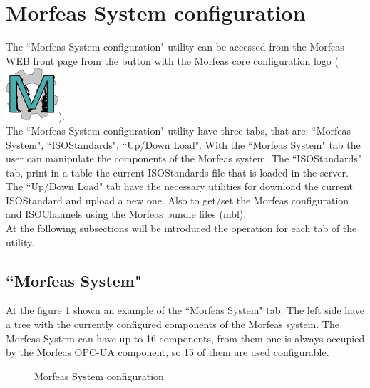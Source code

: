 \newpage
\section{Morfeas System configuration} \label{sys_conf}
The ``Morfeas System configuration" utility can be accessed from the Morfeas WEB front page from the button with the Morfeas core configuration logo
(\includegraphics[height=.150in]{../art/morfeas_gear.png}).\\

The ``Morfeas System configuration" utility have three tabs, that are: ``Morfeas System", ``ISOStandards", ``Up/Down Load".
With the ``Morfeas System" tab the user can manipulate the components of the Morfeas system.
The ``ISOStandards" tab, print in a table the current ISOStandards file that is loaded in the server.
The ``Up/Down Load" tab have the necessary utilities for download the current ISOStandard and upload a new one.
Also to get/set the Morfeas configuration and ISOChannels using the Morfeas bundle files (mbl).\\

\noindent At the following subsections will be introduced the operation for each tab of the utility.

\subsection{``Morfeas System"}
At the figure \ref{fig:Morfeas_sys_conf} shown an example of the ``Morfeas System" tab.
The left side have a tree with the currently configured components of the Morfeas system.
The Morfeas System can have up to 16 components, from them one is always occupied by the Morfeas OPC-UA component,
so 15 of them are used configurable.

\begin{figure}[h]
\centering
	\caption{Morfeas System configuration}
	\label{fig:Morfeas_sys_conf}
\end{figure}

